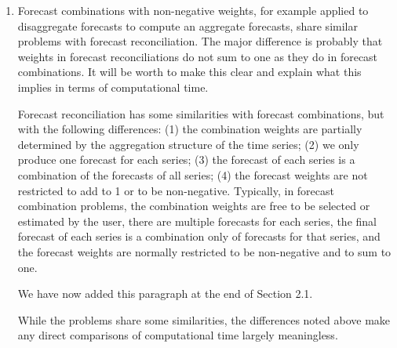 \documentclass[10pt,a4paper]{article}
\begin{document}
\begin{enumerate}
\item
  Forecast combinations with non-negative weights, for example applied to disaggregate forecasts to compute an aggregate forecasts, share similar problems with forecast reconciliation. The major difference is probably that weights in forecast reconciliations do not sum to one as they do in forecast combinations. It will be worth to make this clear and explain what this implies in terms of computational time.

  {\color{blue} Forecast reconciliation has some similarities with forecast combinations, but with the following differences: (1) the combination weights are partially determined by the aggregation structure of the time series; (2) we only produce one forecast for each series; (3) the forecast of each series is a combination of the forecasts of all series; (4) the forecast weights are not restricted to add to 1 or to be non-negative. Typically, in forecast combination problems, the combination weights are free to be selected or estimated by the user, there are multiple forecasts for each series, the final forecast of each series is a combination only of forecasts for that series, and the forecast weights are normally restricted to be non-negative and to sum to one.

  We have now added this paragraph at the end of Section 2.1.

  While the problems share some similarities, the differences noted above make any direct comparisons of computational time largely meaningless.




}
\end{enumerate}
\end{document}
